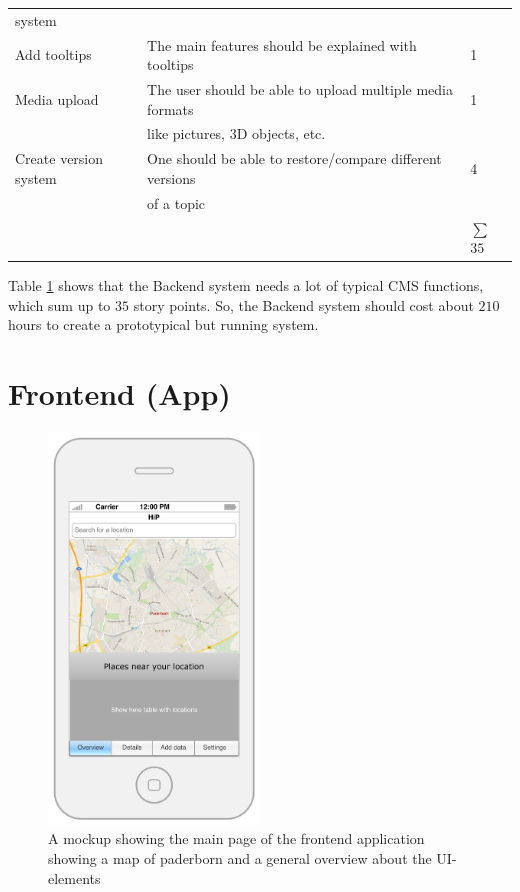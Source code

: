 \begin{table}[h]
\begin{tabular}{lll}
  	 system				& 												&	   \\
	Add tooltips			&	The main features should be explained with tooltips	&	1 \\
	Media upload			&	The user should be able to upload multiple media formats	&	1 \\
	  	 				& 	like pictures, 3D objects, etc.						&	   \\
	Create version system	&	One should be able to restore/compare different versions &	4 \\	
		  	 			& 	of a topic										&	   \\
				  	 	& 												& $\sum$ $35$   \\
	\bottomrule
 \end{tabular}
 \label{tab:costBackend}
 \end{table} 

Table \ref{tab:costBackend} shows that the Backend system needs a lot of typical \ac{CMS} functions, which sum up to $35$ story points. So, the Backend system should cost about $210$ hours to create a prototypical but running system. 

\section{Frontend (App)}
\begin{figure}[th]
\centerline{\includegraphics[width=0.5\textwidth]{gfx/mockup_app_1}}
\caption{A mockup showing the main page of the frontend application showing a map of paderborn and a general overview about the UI-elements}
\label{app1}
\end{figure}

